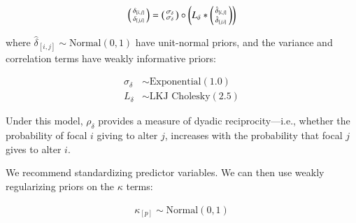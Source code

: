 \documentclass[Afour,sageh,times]{sagej}
\begin{document}
\begin{ceqn}
\begin{equation}
 \begin{psmallmatrix}
\delta_{[i,j]} \\
\delta_{[j,i]}
\end{psmallmatrix}
 =  \begin{psmallmatrix}
\sigma_\delta\\
\sigma_\delta
\end{psmallmatrix} \circ \left(L_\delta*  \begin{psmallmatrix}
\hat\delta_{[i,j]} \\
\hat\delta_{[j,i]}
\end{psmallmatrix}\right)
\end{equation}
\end{ceqn}
where $\hat\delta_{[i,j]}\sim \text {Normal}(0,1)$ have unit-normal priors, and the variance and correlation terms have weakly informative priors:

\begin{ceqn}
\begin{align}
\sigma_\delta &\sim \text {Exponential}(1.0)\label{bob89}\\
L_\delta &\sim \text {LKJ Cholesky}(2.5)\label{bob89L}
\end{align}
\end{ceqn}

Under this model, $\rho_\delta$ provides a measure of dyadic reciprocity---i.e., whether the probability of focal $i$ giving to alter $j$, increases with the probability that focal $j$ gives to alter $i$.

We recommend standardizing predictor variables. We can then use weakly regularizing priors on the $\kappa$ terms:
\begin{ceqn}
\begin{align}\label{booyaaaa}
\kappa_{[p]} \sim \text{Normal}(0, 1)
\end{align}
\end{ceqn}
\end{document}
